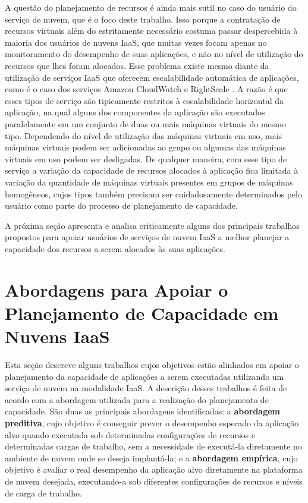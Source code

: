 A questão do planejamento de recursos é ainda mais sutil no caso do usuário do serviço de nuvem, que é o foco deste trabalho. Isso porque a contratação de recursos virtuais além do estritamente necessário costuma passar despercebida à maioria dos usuários de nuvens IaaS, que muitas vezes focam apenas no monitoramento do desempenho de suas aplicações, e não no nível de utilização do recursos que lhes foram alocados. Esse problema existe mesmo diante da utilização de serviços IaaS que oferecem escalabilidade automática de aplicações, como é o caso dos serviços Amazon CloudWatch \cite{amazon_watch} e RightScale \cite{rightscale}. A razão é que esses tipos de serviço são tipicamente restritos à escalabilidade horizontal da aplicação, na qual alguns dos componentes da aplicação são executados paralelamente em um conjunto de duas ou mais máquinas virtuais do mesmo tipo. Dependendo do nível de utilização das máquinas virtuais em uso, mais máquinas virtuais podem ser adicionadas ao grupo ou algumas das máquinas virtuais em uso podem ser desligadas. De qualquer maneira, com esse tipo de serviço a variação da capacidade de recursos alocados à aplicação fica limitada à variação da quantidade de máquinas virtuais presentes em grupos de máquinas homogêneos, cujos tipos também precisam ser cuidadosamente determinados pelo usuário como parte do processo de planejamento de capacidade. 

A próxima seção apresenta e analisa criticamente alguns dos principais trabalhos propostos para apoiar usuários de serviços de nuvem IaaS a melhor planejar a capacidade dos recursos a serem alocados às suas aplicações.

\section{Abordagens para Apoiar o Planejamento de Capacidade em Nuvens IaaS}

Esta seção descreve alguns trabalhos cujos objetivos estão alinhados em apoiar o planejamento da capacidade de aplicações a serem executadas utilizando um serviço de nuvem na modalidade IaaS. A descrição desses trabalhos é feita de acordo com a abordagem utilizada para a realização do planejamento de capacidade. São duas as principais abordagens identificadas: a \textbf{abordagem preditiva}, cujo objetivo é conseguir prever o desempenho esperado da aplicação alvo quando executada sob determinadas configurações de recursos e determinadas cargas de trabalho, sem a necessidade de executá-la diretamente no ambiente de nuvem onde se deseja implantá-la; e a \textbf{abordagem empírica}, cujo objetivo é avaliar o real desempenho da aplicação alvo diretamente na plataforma de nuvem desejada, executando-a sob diferentes configurações de recursos e níveis de carga de trabalho. 

